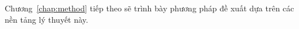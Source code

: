 \documentclass[12pt, a4paper]{report}
\begin{document}
Chương~\ref{chap:method} tiếp theo sẽ trình bày phương pháp đề xuất
dựa trên các nền tảng lý thuyết này.

\printbibliography[title={Tài liệu tham khảo}]
\end{document}
